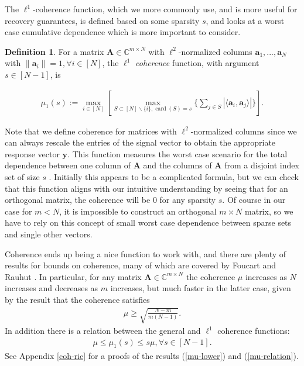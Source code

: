 \documentclass[12pt,a4paper]{amsart}
\numberwithin{equation}{section}
\theoremstyle{plain}
\theoremstyle{definition}
\newtheorem{Def}[Th]{Definition}
\newcommand{\BC}{\mathbb C}
\newcommand{\bdy}{\mathbf{y}}
\newcommand{\bda}{\mathbf{a}}
\newcommand{\bdA}{\mathbf{A}}
\DeclareMathOperator{\card}{card}
\begin{document}
The $\ell^1$-coherence function, which we more commonly use, and is more useful for recovery guarantees, is defined based on some sparsity $s$, and looks at a worst case cumulative dependence which is more important to consider.

\begin{Def}\label{cohthm} For a matrix $\bdA\in\BC^{m\times N}$ with $\ell^2$-normalized columns $\bda_1,...,\bda_N$ with $\|\bda_i\|=1,\forall i\in[N]$, the $\ell^1$ \textit{coherence} function, with argument $s\in[N-1]$, is

\begin{align}\label{cohsta}
    \mu_1(s):=\max_{i\in[N]}\left[\max_{S\subset[N]\backslash\{i\},\card(S)=s}\{\sum_{j\in S}|\langle \bda_i,\bda_j\rangle|\}\right].
\end{align}
\end{Def}

Note that we define coherence for matrices with $\ell^2$-normalized columns since we can always rescale the entries of the signal vector to obtain the appropriate response vector $\bdy$. This function measures the worst case scenario for the total dependence between one column of $\bdA$ and the columns of $\bdA$ from a disjoint index set of size $s$ \cite{fou-rau}. Initially this appears to be a complicated formula, but we can check that this function aligns with our intuitive understanding by seeing that for an orthogonal matrix, the coherence will be 0 for any sparsity $s$. Of course in our case for $m<N$, it is impossible to construct an orthogonal $m\times N$ matrix, so we have to rely on this concept of small worst case dependence between sparse sets and single other vectors.

Coherence ends up being a nice function to work with, and there are plenty of results for bounds on coherence, many of which are covered by Foucart and Rauhut \cite{fou-rau}. In particular, for any matrix $\bdA\in\BC^{m\times N}$ the coherence $\mu$ increases as $N$ increases and decreases as $m$ increases, but much faster in the latter case, given by the result that the coherence satisfies \cite{fou-rau}
\begin{align}\label{mu-lower}
    \mu\geq\sqrt{\frac{N-m}{m(N-1)}}.
\end{align}
In addition there is a relation between the general and $\ell^1$ coherence functions:
\begin{align}\label{mu-relation}
    \mu\leq\mu_1(s)\leq s\mu, \forall s\in[N-1].
\end{align}
See Appendix \ref{coh-ric} for a proofs of the results (\ref{mu-lower}) and (\ref{mu-relation}).
\end{document}

